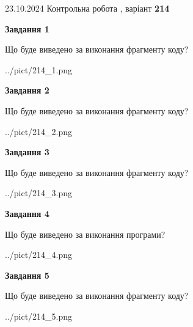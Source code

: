 \documentclass[12pt, ukrainian]{article}
\begin{document}
{\Large{23.10.2024 Контрольна робота , варіант  \No \textbf { 214 }\par}}
{
\begin {large}
{\begin {center}\textbf{Завдання 1}\end {center}}

Що буде виведено за виконання фрагменту коду?\par
\begin{center}
	{../pict/214_1.png}
\end{center}
\newpage

{\begin {center}\textbf{Завдання 2}\end {center}}

Що буде виведено за виконання фрагменту коду?\par
\begin{center}
	{../pict/214_2.png}
\end{center}
\newpage

{\begin {center}\textbf{Завдання 3}\end {center}}

Що буде виведено за виконання фрагменту коду?\par
\begin{center}
	{../pict/214_3.png}
\end{center}
\newpage

{\begin {center}\textbf{Завдання 4}\end {center}}

Що буде виведено за виконання програми?\par
\begin{center}
	{../pict/214_4.png}
\end{center}
\newpage

{\begin {center}\textbf{Завдання 5}\end {center}}

Що буде виведено за виконання фрагменту коду?\par
\begin{center}
	{../pict/214_5.png}
\end{center}
\newpage


\end{large}}
\end{document}
